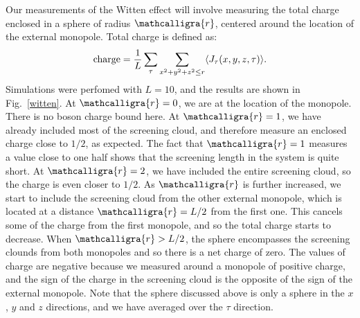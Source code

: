 \documentclass[prb,twocolumn]{revtex4-1}
\newcommand{\scripty}[1]{\ensuremath{\mathcalligra{#1}}}
\begin{document}
Our measurements of the Witten effect will involve measuring the total charge enclosed in a sphere of radius $\scripty{r}$, centered around the location of the external monopole. Total charge is defined as:
\begin{equation}
{\rm charge}=\frac{1}{L}\sum_\tau \sum_{x^2+y^2+z^2\leq r} \langle J_\tau(x,y,z,\tau) \rangle.
\end{equation}
Simulations were perfomed with $L=10$, and the results are shown in Fig.~\ref{witten}.
At $\scripty{r}=0$, we are at the location of the monopole. There is no boson charge bound here. At $\scripty{r}=1$, we have already included most of the screening cloud, and therefore measure an enclosed charge close to $1/2$, as expected. The fact that $\scripty{r}=1$ measures a value close to one half shows that the screening length in the system is quite short. At $\scripty{r}=2$, we have included the entire screening cloud, so the charge is even closer to $1/2$. As $\scripty{r}$ is further increased, we start to include the screening cloud from the other external monopole, which is located at a distance $\scripty{r}=L/2$ from the first one. This cancels some of the charge from the first monopole, and so the total charge starts to decrease. When $\scripty{r}>L/2$, the sphere encompasses the screening clounds from both monopoles and so there is a net charge of zero. The values of charge are negative because we measured around a monopole of positive charge, and the sign of the charge in the screening cloud is the opposite of the sign of the external monopole. Note that the sphere discussed above is only a sphere in the $x$, $y$ and $z$ directions, and we have averaged over the $\tau$ direction.
\end{document}

